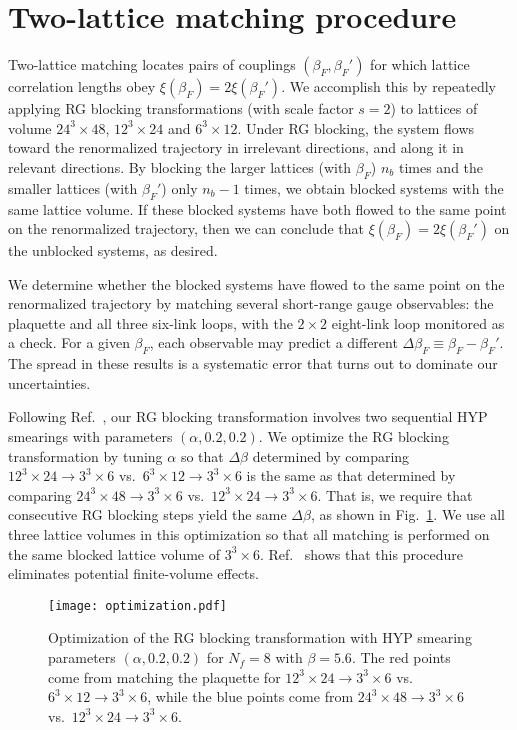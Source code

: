 \documentclass{PoS}
\newcommand{\al}{\ensuremath{\alpha} }
\newcommand{\be}{\ensuremath{\beta} }
\newcommand{\De}{\ensuremath{\Delta} }
\newcommand{\X}{\ensuremath{\!\times\!} }
\newcommand{\refcite}[1]{Ref.~\cite{#1}}
\newcommand{\fig}[1]{Fig.~\ref{#1}}
\begin{document}
\section{\label{sec:MCRG}Two-lattice matching procedure} %
Two-lattice matching locates pairs of couplings $(\be_F, \be_F')$ for which lattice correlation lengths obey $\xi(\be_F) = 2\xi(\be_F')$.
We accomplish this by repeatedly applying RG blocking transformations (with scale factor $s = 2$) to lattices of volume $24^3\X48$, $12^3\X24$ and $6^3\X12$.
Under RG blocking, the system flows toward the renormalized trajectory in irrelevant directions, and along it in relevant directions.
By blocking the larger lattices (with $\be_F$) $n_b$ times and the smaller lattices (with $\be_F'$) only $n_b - 1$ times, we obtain blocked systems with the same lattice volume.
If these blocked systems have both flowed to the same point on the renormalized trajectory, then we can conclude that $\xi(\be_F) = 2\xi(\be_F')$ on the unblocked systems, as desired.

We determine whether the blocked systems have flowed to the same point on the renormalized trajectory by matching several short-range gauge observables: the plaquette and all three six-link loops, with the $2\X2$ eight-link loop monitored as a check.
For a given $\be_F$, each observable may predict a different $\De\be_F \equiv \be_F - \be_F'$.
The spread in these results is a systematic error that turns out to dominate our uncertainties.

Following \refcite{Hasenfratz:2011xn}, our RG blocking transformation involves two sequential HYP smearings with parameters $(\al, 0.2, 0.2)$.
We optimize the RG blocking transformation by tuning \al so that $\De\be$ determined by comparing $12^3\X24 \to 3^3\X6$ vs.\ $6^3\X12 \to 3^3\X6$ is the same as that determined by comparing $24^3\X48 \to 3^3\X6$ vs.\ $12^3\X24 \to 3^3\X6$.
That is, we require that consecutive RG blocking steps yield the same $\De\be$, as shown in \fig{fig:opt}.
We use all three lattice volumes in this optimization so that all matching is performed on the same blocked lattice volume of $3^3\X6$.
\refcite{Hasenfratz:2011xn} shows that this procedure eliminates potential finite-volume effects.

\begin{figure}[htpb]
  \centering
  \texttt{[image: optimization.pdf]}
  \caption{Optimization of the RG blocking transformation with HYP smearing parameters $(\al, 0.2, 0.2)$ for $N_f = 8$ with $\be = 5.6$.  The red points come from matching the plaquette for $12^3\X24 \to 3^3\X6$ vs.\ $6^3\X12 \to 3^3\X6$, while the blue points come from $24^3\X48 \to 3^3\X6$ vs.\ $12^3\X24 \to 3^3\X6$.}
  \label{fig:opt}
\end{figure}
\end{document}
